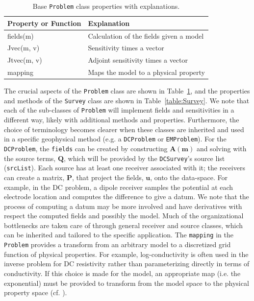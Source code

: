 \documentclass[preprint,review,3p,times,onecolumn,authoryear]{elsarticle}
\newcommand{\Survey}{\texttt{Survey}\xspace}
\newcommand{\DCSurvey}{\texttt{DCSurvey}\xspace}
\newcommand{\Problem}{\texttt{Problem}\xspace}
\newcommand{\DCProblem}{\texttt{DCProblem}\xspace}
\newcommand{\EMProblem}{\texttt{EMProblem}\xspace}
\renewcommand {\u}  { {\mathbf u} }
\begin{document}
{%
\begin{table}[ht]
\caption{Base \Problem class properties with explanations.}
\scriptsize
\label{table:Problem}
  \begin{tabular}{  p{2.5cm}  p{4.5cm} }
    \hline

    Property or Function & Explanation \\ \hline

    fields(m)   & Calculation of the fields given a model\\
    Jvec(m, v)  & Sensitivity times a vector\\
    Jtvec(m, v) & Adjoint sensitivity times a vector\\
    mapping     & Maps the model to a physical property\\

    \hline
  \end{tabular}
\end{table}
}


The crucial aspects of the \Problem class are shown in Table~\ref{table:Problem},
and the properties and methods of the \Survey class are shown in Table~\ref{table:Survey}.
We note that each of the sub-classes of \Problem will implement fields and
sensitivities in a different way, likely with additional methods and properties.
Furthermore, the choice of terminology becomes clearer when these
classes are inherited and used in a specific geophysical method (e.g. a \DCProblem or \EMProblem).
For the \DCProblem, the \texttt{fields} can be created by constructing $\mathbf{A(m)}$
and solving with the source terms, $\mathbf{Q}$,
which will be provided by the \DCSurvey's source list (\texttt{srcList}).
Each source has at least one receiver associated with it;
the receivers can create a matrix, $\mathbf{P}$, that project the
fields, $\u$, onto the data-space. For example, in the DC problem, a dipole receiver samples the potential at each electrode location and computes the difference to give a datum.
We note that the process of computing a datum may be more involved and have derivatives with respect the computed fields and possibly the model.
Much of the organizational
bottlenecks are taken care of through general receiver and source classes,
which can be inherited and tailored to the specific application.
The \texttt{mapping} in the \Problem provides a transform from an arbitrary model to a discretized grid function
of physical properties. For example, log-conductivity is often used in the
inverse problem for DC resistivity rather than parameterizing
directly in terms of conductivity. If this choice is made for the model,
an appropriate map (i.e. the exponential) must be provided to transform from the model space to the
physical property space (cf. \cite{HeagySEG2014}).
\end{document}
